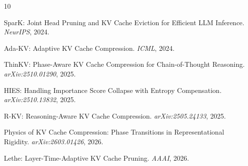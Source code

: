 \documentclass[11pt]{article}
\begin{document}

\begin{thebibliography}{10}

SparK: Joint Head Pruning and KV Cache Eviction for Efficient LLM Inference. \emph{NeurIPS}, 2024.

Ada-KV: Adaptive KV Cache Compression. \emph{ICML}, 2024.

ThinKV: Phase-Aware KV Cache Compression for Chain-of-Thought Reasoning. \emph{arXiv:2510.01290}, 2025.

HIES: Handling Importance Score Collapse with Entropy Compensation. \emph{arXiv:2510.13832}, 2025.

R-KV: Reasoning-Aware KV Cache Compression. \emph{arXiv:2505.24133}, 2025.

Physics of KV Cache Compression: Phase Transitions in Representational Rigidity. \emph{arXiv:2603.01426}, 2026.

Lethe: Layer-Time-Adaptive KV Cache Pruning. \emph{AAAI}, 2026.

\end{thebibliography}
\end{document}
